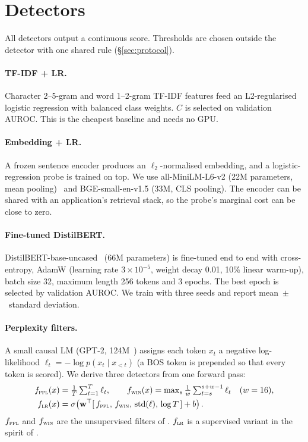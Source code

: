 \documentclass[11pt]{article}
\begin{document}
\section{Detectors}
\label{sec:detectors}

All detectors output a continuous score. Thresholds are chosen outside the detector with
one shared rule (\S\ref{sec:protocol}).

\paragraph{TF-IDF + LR.} Character 2--5-gram and word 1--2-gram TF-IDF features feed an
L2-regularised logistic regression with balanced class weights. $C$ is selected on
validation AUROC. This is the cheapest baseline and needs no GPU.

\paragraph{Embedding + LR.} A frozen sentence encoder produces an $\ell_2$-normalised
embedding, and a logistic-regression probe is trained on top. We use all-MiniLM-L6-v2
(22M parameters, mean pooling)~\citep{wang2020minilm,reimers2019sentence} and
BGE-small-en-v1.5 (33M, CLS pooling). The encoder can be shared with an application's
retrieval stack, so the probe's marginal cost can be close to zero.

\paragraph{Fine-tuned DistilBERT.} DistilBERT-base-uncased~\citep{sanh2019distilbert}
(66M parameters) is fine-tuned end to end with cross-entropy, AdamW (learning rate
$3\times10^{-5}$, weight decay 0.01, 10\% linear warm-up), batch size 32, maximum length
256 tokens and 3 epochs. The best epoch is selected by validation AUROC. We train with
three seeds and report mean~$\pm$~standard deviation.

\paragraph{Perplexity filters.} A small causal LM (GPT-2, 124M~\citep{radford2019language})
assigns each token $x_t$ a negative log-likelihood $\ell_t=-\log p(x_t\mid x_{<t})$ (a BOS
token is prepended so that every token is scored). We derive three detectors from one
forward pass:
\begin{align}
  f_{\textsc{ppl}}(x) &= \tfrac{1}{T}\textstyle\sum_{t=1}^{T}\ell_t, \qquad
  f_{\textsc{win}}(x) = \max_{s}\tfrac{1}{w}\textstyle\sum_{t=s}^{s+w-1}\ell_t \quad (w=16),\\
  f_{\textsc{lr}}(x) &= \sigma\!\left(\mathbf{w}^\top[\,f_{\textsc{ppl}},\,f_{\textsc{win}},\,\mathrm{std}(\ell),\,\log T\,]+b\right).
\end{align}
$f_{\textsc{ppl}}$ and $f_{\textsc{win}}$ are the unsupervised filters of
\citet{jain2023baseline}. $f_{\textsc{lr}}$ is a supervised variant in the spirit of
\citet{alon2023detecting}.
\end{document}
